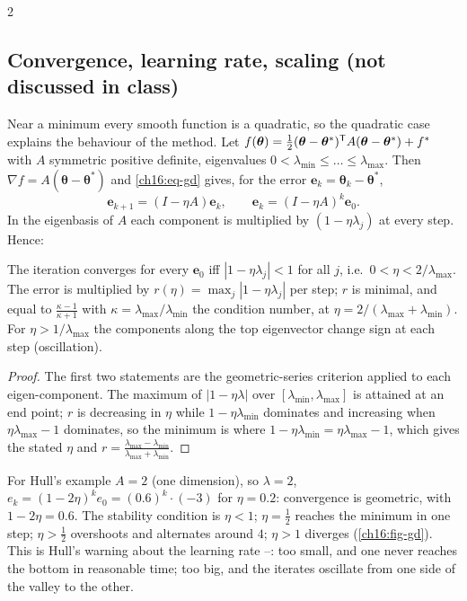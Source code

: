 \begin{paracol}{2}
\subsection{Convergence, learning rate, scaling (not discussed in class)}
Near a minimum every smooth function is a quadratic, so the quadratic case explains the behaviour of the method.
Let $f(\bm\theta)=\tfrac12(\bm\theta-\bm\theta^*)^{\mathsf T} A(\bm\theta-\bm\theta^*)+f^*$ with $A$ symmetric positive definite, eigenvalues
$0<\lambda_{\min}\le\dots\le\lambda_{\max}$. Then $\nabla f=A(\bm\theta-\bm\theta^*)$ and \eqref{ch16:eq-gd} gives, for the error $\bm e_k=\bm\theta_k-\bm\theta^*$,
\[
  \bm e_{k+1}=(I-\eta A)\bm e_k,\qquad \bm e_k=(I-\eta A)^k\bm e_0 .
\]
In the eigenbasis of $A$ each component is multiplied by $(1-\eta\lambda_j)$ at every step. Hence:
\begin{proposition}\label{ch16:prop-gd}
The iteration converges for every $\bm e_0$ iff $|1-\eta\lambda_j|<1$ for all $j$, i.e.\ $0<\eta<2/\lambda_{\max}$. The error is
multiplied by $r(\eta)=\max_j|1-\eta\lambda_j|$ per step; $r$ is minimal, and equal to $\frac{\kappa-1}{\kappa+1}$
with $\kappa=\lambda_{\max}/\lambda_{\min}$ the condition number, at $\eta=2/(\lambda_{\max}+\lambda_{\min})$.
For $\eta>1/\lambda_{\max}$ the components along the top eigenvector change sign at each step (oscillation).
\end{proposition}
\begin{proof}
The first two statements are the geometric-series criterion applied to each eigen-component. The maximum of $|1-\eta\lambda|$ over $[\lambda_{\min},\lambda_{\max}]$ is attained at an end point;
$r$ is decreasing in $\eta$ while $1-\eta\lambda_{\min}$ dominates and increasing when $\eta\lambda_{\max}-1$ dominates, so the minimum is where
$1-\eta\lambda_{\min}=\eta\lambda_{\max}-1$, which gives the stated $\eta$ and $r=\frac{\lambda_{\max}-\lambda_{\min}}{\lambda_{\max}+\lambda_{\min}}$.
\end{proof}
For Hull's example $A=2$ (one dimension), so $\lambda=2$, $e_k=(1-2\eta)^ke_0=(0.6)^k\cdot(-3)$ for $\eta=0.2$: convergence is geometric, with $1-2\eta=0.6$. The
stability condition is $\eta<1$; $\eta=\tfrac12$ reaches the minimum in one step; $\eta>\tfrac12$ overshoots and alternates around $4$; $\eta>1$ diverges
(\cref{ch16:fig-gd}). This is Hull's warning about the learning rate --: too small, and one never reaches the bottom in reasonable time; too big, and the iterates
oscillate from one side of the valley to the other.


\end{paracol}
